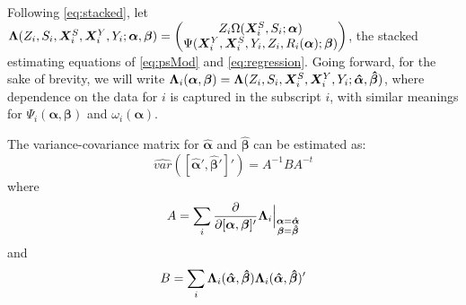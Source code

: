 \documentclass[]{article}
\begin{document}
\sloppy
Following \eqref{eq:stacked}, let $\bm{\Lambda}(Z_i,S_i,\bm{X}^S_i,\bm{X}^Y_i,Y_i;\bm{\alpha},\bm{\beta})=\begin{pmatrix} Z_i\Omega(\bm{X}^S_i,S_i;\bm{\alpha})\\ \Psi(\bm{X}^Y_i,\bm{X}^S_i,Y_i,Z_i,R_i(\bm{\alpha});\bm{\beta})\end{pmatrix}$, the stacked estimating equations of \eqref{eq:psMod} and \eqref{eq:regression}.
Going forward, for the sake of brevity, we will write $\bm{\Lambda}_i(\bm{\alpha},\bm{\beta})=\bm{\Lambda}(Z_i,S_i,\bm{X}^S_i,\bm{X}^Y_i,Y_i;\bm{\hat{\alpha}},\bm{\hat{\beta}})$, where dependence on the data for $i$ is captured in the subscript $i$, with similar meanings for $\Psi_i(\bm{\alpha},\bm{\beta})$ and $\omega_i(\bm{\alpha})$.

The variance-covariance matrix for $\bm{\hat{\alpha}}$ and $\bm{\hat{\beta}}$ can be estimated as:
\begin{equation*}
  \widehat{var}\left([\bm{\hat{\alpha}}',\bm{\hat{\beta}}']'\right)=A^{-1}BA^{-t}
\end{equation*}
where
\begin{equation*}%
  A=\sum_i \frac{\partial}{\partial [\bm{\alpha},\bm{\beta}]'} \blam_i\Bigr|_{\substack{\bm{\alpha}=\bm{\hat{\alpha}}\\\bm{\beta}=\bm{\hat{\beta}}}}
\end{equation*}
and
\begin{equation*}%
  B=\sum_i \blam_i(\bm{\hat{\alpha}},\bm{\hat{\beta}})\blam_i(\bm{\hat{\alpha}},\bm{\hat{\beta}})'
\end{equation*}
\end{document}
